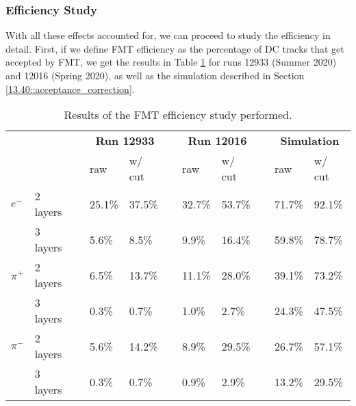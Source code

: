 \subsubsection{Efficiency Study}
\label{14.14::efficiency_study}
    With all these effects accounted for, we can proceed to study the efficiency in detail.
    First, if we define FMT efficiency as the percentage of DC tracks that get accepted by FMT, we get the results in Table \ref{tab::14.14::fmt_efficiency_study} for runs 12933 (Summer 2020) and 12016 (Spring 2020), as well as the simulation described in Section \ref{13.40::acceptance_correction}.

    \begin{table}[b]
        \begin{center}
            \begin{tabularx}{0.895\textwidth}{llcllcllcll}
                \toprule
                & & & \multicolumn{2}{c}{\textbf{Run 12933}} & & \multicolumn{2}{c}{\textbf{Run 12016}} & & \multicolumn{2}{c}{\textbf{Simulation}} \\
                                 &          & & raw  & w/ cut   & & raw  & w/ cut   & & raw    & w/ cut \\
                \midrule \midrule
                \textbf{$e^-$}   & 2 layers & & 25.1\% & 37.5\% & & 32.7\% & 53.7\% & & 71.7\% & 92.1\% \\
                                 & 3 layers & &  5.6\% &  8.5\% & &  9.9\% & 16.4\% & & 59.8\% & 78.7\% \\
                \midrule
                \textbf{$\pi^+$} & 2 layers & &  6.5\% & 13.7\% & & 11.1\% & 28.0\% & & 39.1\% & 73.2\% \\
                                 & 3 layers & &  0.3\% &  0.7\% & &  1.0\% &  2.7\% & & 24.3\% & 47.5\% \\
                \midrule
                \textbf{$\pi^-$} & 2 layers & &  5.6\% & 14.2\% & &  8.9\% & 29.5\% & & 26.7\% & 57.1\% \\
                                 & 3 layers & &  0.3\% &  0.7\% & &  0.9\% &  2.9\% & & 13.2\% & 29.5\% \\
                \bottomrule
            \end{tabularx}
        \end{center}
        \caption[FMT efficiency study results]
        {Results of the FMT efficiency study performed.}
        \label{tab::14.14::fmt_efficiency_study}
    \end{table}

